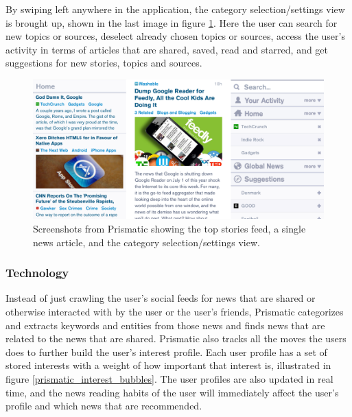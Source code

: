 By swiping left anywhere in the application, the category selection/settings view is brought up, shown in the last image in figure \ref{screenshots_prismatic}. Here the user can search for new topics or sources, deselect already chosen topics or sources, access the user's activity in terms of articles that are shared, saved, read and starred, and get suggestions for new stories, topics and sources. 

\begin{figure}[!htbp]
\centering
\includegraphics[width=130mm]{GFX/screenshots/prismatic.png}
\caption{Screenshots from Prismatic showing the top stories feed, a single news article, and the category selection/settings view.}
\label{screenshots_prismatic}
\end{figure}

\subsubsection{Technology}
Instead of just crawling the user's social feeds for news that are shared or otherwise interacted with by the user or the user's friends, Prismatic categorizes and extracts keywords and entities from those news and finds news that are related to the news that are shared. Prismatic also tracks all the moves the users does to further build the user's interest profile. Each user profile has a set of stored interests with a weight of how important that interest is, illustrated in figure \ref{prismatic_interest_bubbles}. The user profiles are also updated in real time, and the news reading habits of the user will immediately affect the user's profile and which news that are recommended\cite{prismatic_how_it_works}.

